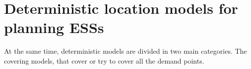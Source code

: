 \section{Deterministic location models for planning ESSs}
At the same time,
deterministic models
are divided in two main categories.
The covering models,
that cover or try to cover
all the demand points.



